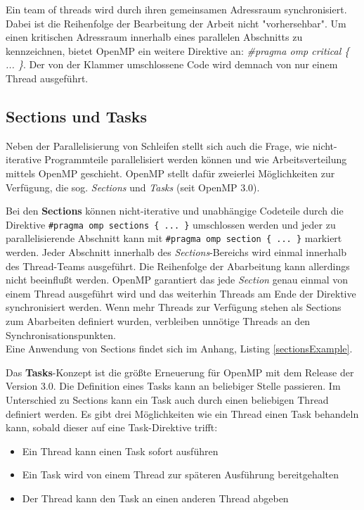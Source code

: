 \documentclass[11pt]{scrartcl}
\begin{document}
Ein team of threads wird durch ihren gemeinsamen Adressraum synchronisiert. Dabei ist die Reihenfolge der Bearbeitung der Arbeit nicht "vorhersehbar". Um einen kritischen Adressraum innerhalb eines parallelen Abschnitts zu kennzeichnen, bietet OpenMP ein weitere Direktive an: \textit{\#pragma omp critical \{ ... \}}. Der von der Klammer umschlossene Code wird demnach von nur einem Thread ausgeführt. 

\subsection{Sections und Tasks}

Neben der Parallelisierung von Schleifen stellt sich auch die Frage, wie nicht-iterative Programmteile parallelisiert werden können und  wie Arbeitsverteilung mittels OpenMP geschieht. OpenMP stellt dafür zweierlei Möglichkeiten zur Verfügung, die sog. \textit{Sections} und \textit{Tasks} (seit OpenMP 3.0).

Bei den \textbf{Sections} können nicht-iterative und unabhängige Codeteile durch die Direktive \texttt{\#pragma omp sections \{ ... \}} umschlossen werden und jeder zu parallelisierende Abschnitt kann mit \texttt{\#pragma omp section \{ ... \}} markiert werden. Jeder Abschnitt innerhalb des \textit{Sections}-Bereichs wird einmal innerhalb des Thread-Teams ausgeführt. Die Reihenfolge der Abarbeitung kann allerdings nicht beeinflußt werden. OpenMP garantiert das jede \textit{Section} genau einmal von einem Thread ausgeführt wird und das weiterhin Threads am Ende der Direktive synchronisiert werden. Wenn mehr Threads zur Verfügung stehen als Sections zum Abarbeiten definiert wurden, verbleiben unnötige Threads an den Synchronisationspunkten. \\
Eine Anwendung von Sections findet sich im Anhang, Listing \ref{sectionsExample}.

Das \textbf{Tasks}-Konzept ist die größte Erneuerung für OpenMP mit dem Release der Version 3.0. Die Definition eines Tasks kann an beliebiger Stelle passieren. Im Unterschied zu Sections kann ein Task auch durch einen beliebigen Thread definiert werden. Es gibt drei Möglichkeiten wie ein Thread einen Task behandeln kann, sobald dieser auf eine Task-Direktive trifft:
\begin{itemize}
\item{Ein Thread kann einen Task sofort ausführen}
\item{Ein Task wird von einem Thread zur späteren Ausführung bereitgehalten}
\item{Der Thread kann den Task an einen anderen Thread abgeben}
\end{itemize}
\end{document}
